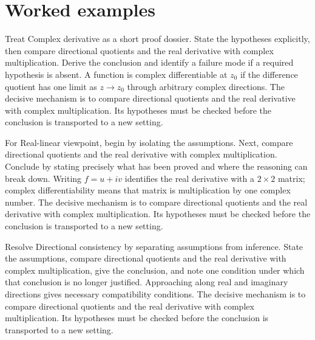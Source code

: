 \section{Worked examples}

\begin{example}\label{ex:iv01-worked-01}
Treat Complex derivative as a short proof dossier. State the hypotheses explicitly, then compare directional quotients and the real derivative with complex multiplication. Derive the conclusion and identify a failure mode if a required hypothesis is absent. A function is complex differentiable at $z_0$ if the difference quotient has one limit as $z\to z_0$ through arbitrary complex directions. The decisive mechanism is to compare directional quotients and the real derivative with complex multiplication. Its hypotheses must be checked before the conclusion is transported to a new setting.
\end{example}

\begin{example}\label{ex:iv01-worked-02}
For Real-linear viewpoint, begin by isolating the assumptions. Next, compare directional quotients and the real derivative with complex multiplication. Conclude by stating precisely what has been proved and where the reasoning can break down. Writing $f=u+iv$ identifies the real derivative with a $2\times2$ matrix; complex differentiability means that matrix is multiplication by one complex number. The decisive mechanism is to compare directional quotients and the real derivative with complex multiplication. Its hypotheses must be checked before the conclusion is transported to a new setting.
\end{example}

\begin{example}\label{ex:iv01-worked-03}
Resolve Directional consistency by separating assumptions from inference. State the assumptions, compare directional quotients and the real derivative with complex multiplication, give the conclusion, and note one condition under which that conclusion is no longer justified. Approaching along real and imaginary directions gives necessary compatibility conditions. The decisive mechanism is to compare directional quotients and the real derivative with complex multiplication. Its hypotheses must be checked before the conclusion is transported to a new setting.
\end{example}

